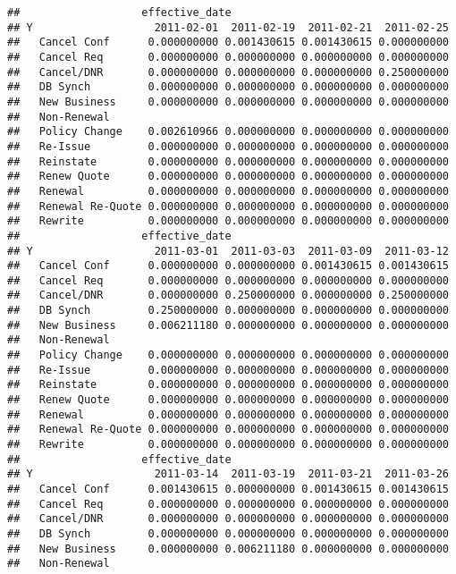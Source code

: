 \documentclass[]{article}
\begin{document}
\begin{verbatim}
##                   effective_date
## Y                   2011-02-01  2011-02-19  2011-02-21  2011-02-25
##   Cancel Conf      0.000000000 0.001430615 0.001430615 0.000000000
##   Cancel Req       0.000000000 0.000000000 0.000000000 0.000000000
##   Cancel/DNR       0.000000000 0.000000000 0.000000000 0.250000000
##   DB Synch         0.000000000 0.000000000 0.000000000 0.000000000
##   New Business     0.000000000 0.000000000 0.000000000 0.000000000
##   Non-Renewal                                                     
##   Policy Change    0.002610966 0.000000000 0.000000000 0.000000000
##   Re-Issue         0.000000000 0.000000000 0.000000000 0.000000000
##   Reinstate        0.000000000 0.000000000 0.000000000 0.000000000
##   Renew Quote      0.000000000 0.000000000 0.000000000 0.000000000
##   Renewal          0.000000000 0.000000000 0.000000000 0.000000000
##   Renewal Re-Quote 0.000000000 0.000000000 0.000000000 0.000000000
##   Rewrite          0.000000000 0.000000000 0.000000000 0.000000000
##                   effective_date
## Y                   2011-03-01  2011-03-03  2011-03-09  2011-03-12
##   Cancel Conf      0.000000000 0.000000000 0.001430615 0.001430615
##   Cancel Req       0.000000000 0.000000000 0.000000000 0.000000000
##   Cancel/DNR       0.000000000 0.250000000 0.000000000 0.250000000
##   DB Synch         0.250000000 0.000000000 0.000000000 0.000000000
##   New Business     0.006211180 0.000000000 0.000000000 0.000000000
##   Non-Renewal                                                     
##   Policy Change    0.000000000 0.000000000 0.000000000 0.000000000
##   Re-Issue         0.000000000 0.000000000 0.000000000 0.000000000
##   Reinstate        0.000000000 0.000000000 0.000000000 0.000000000
##   Renew Quote      0.000000000 0.000000000 0.000000000 0.000000000
##   Renewal          0.000000000 0.000000000 0.000000000 0.000000000
##   Renewal Re-Quote 0.000000000 0.000000000 0.000000000 0.000000000
##   Rewrite          0.000000000 0.000000000 0.000000000 0.000000000
##                   effective_date
## Y                   2011-03-14  2011-03-19  2011-03-21  2011-03-26
##   Cancel Conf      0.001430615 0.000000000 0.001430615 0.001430615
##   Cancel Req       0.000000000 0.000000000 0.000000000 0.000000000
##   Cancel/DNR       0.000000000 0.000000000 0.000000000 0.000000000
##   DB Synch         0.000000000 0.000000000 0.000000000 0.000000000
##   New Business     0.000000000 0.006211180 0.000000000 0.000000000
##   Non-Renewal                                                     

\end{verbatim}
\end{document}
